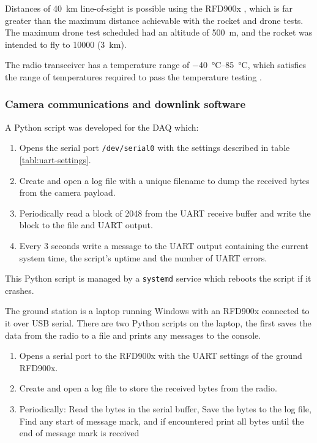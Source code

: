 \documentclass[]{report}
\begin{document}
Distances of \SI{40}{\kilo\metre} line-of-sight is possible using the RFD900x \cite{rfdesign2020rfd900x}, which is far greater than the maximum distance achievable with the rocket and drone tests. The maximum drone test scheduled had an altitude of \SI{500}{\metre}, and the rocket was intended to fly to \SI{10000}{\feet} (\SI{3}{\kilo\metre}).




The radio transceiver has a temperature range of \SIrange{-40}{85}{\degreeCelsius}, which satisfies the range of temperatures required to pass the temperature testing \cite{rfdesign2020rfd900x}.


\subsubsection{Camera communications and downlink software}

A Python script was developed for the DAQ which:

\begin{enumerate}
  \item Opens the serial port \texttt{/dev/serial0} with the settings described in table \ref{tabl:uart-settings}.
  \item Create and open a log file with a unique filename to dump the received bytes from the camera payload.
  \item Periodically read a block of 2048 from the UART receive buffer and write the block to the file and UART output.
  \item Every 3 seconds write a message to the UART output containing the current system time, the script's uptime and the number of UART errors.
\end{enumerate}

This Python script is managed by a \texttt{systemd} service which reboots the script if it crashes.

The ground station is a laptop running Windows with an RFD900x connected to it over USB serial. There are two Python scripts on the laptop, the first saves the data from the radio to a file and prints any messages to the console.

\begin{enumerate}
  \item Opens a serial port to the RFD900x with the UART settings of the ground RFD900x.
  \item Create and open a log file to store the received bytes from the radio.
  \item Periodically:
        \subitem Read the bytes in the serial buffer,
        \subitem Save the bytes to the log file,
        \subitem Find any start of message mark, and if encountered print all bytes until the end of message mark is received
\end{enumerate}
\end{document}
